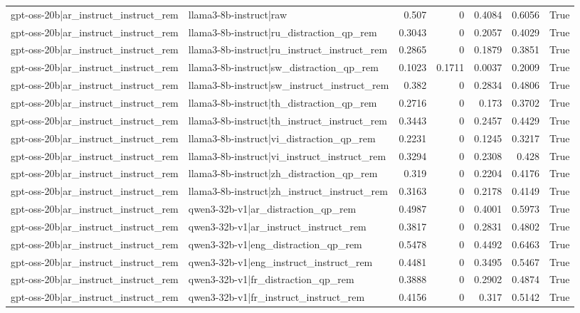 \begin{table}
\begin{tabular}{l l r r r r l}
gpt-oss-20b|ar_instruct_instruct_rem & llama3-8b-instruct|raw & 0.507 & 0 & 0.4084 & 0.6056 & True \\
gpt-oss-20b|ar_instruct_instruct_rem & llama3-8b-instruct|ru_distraction_qp_rem & 0.3043 & 0 & 0.2057 & 0.4029 & True \\
gpt-oss-20b|ar_instruct_instruct_rem & llama3-8b-instruct|ru_instruct_instruct_rem & 0.2865 & 0 & 0.1879 & 0.3851 & True \\
gpt-oss-20b|ar_instruct_instruct_rem & llama3-8b-instruct|sw_distraction_qp_rem & 0.1023 & 0.1711 & 0.0037 & 0.2009 & True \\
gpt-oss-20b|ar_instruct_instruct_rem & llama3-8b-instruct|sw_instruct_instruct_rem & 0.382 & 0 & 0.2834 & 0.4806 & True \\
gpt-oss-20b|ar_instruct_instruct_rem & llama3-8b-instruct|th_distraction_qp_rem & 0.2716 & 0 & 0.173 & 0.3702 & True \\
gpt-oss-20b|ar_instruct_instruct_rem & llama3-8b-instruct|th_instruct_instruct_rem & 0.3443 & 0 & 0.2457 & 0.4429 & True \\
gpt-oss-20b|ar_instruct_instruct_rem & llama3-8b-instruct|vi_distraction_qp_rem & 0.2231 & 0 & 0.1245 & 0.3217 & True \\
gpt-oss-20b|ar_instruct_instruct_rem & llama3-8b-instruct|vi_instruct_instruct_rem & 0.3294 & 0 & 0.2308 & 0.428 & True \\
gpt-oss-20b|ar_instruct_instruct_rem & llama3-8b-instruct|zh_distraction_qp_rem & 0.319 & 0 & 0.2204 & 0.4176 & True \\
gpt-oss-20b|ar_instruct_instruct_rem & llama3-8b-instruct|zh_instruct_instruct_rem & 0.3163 & 0 & 0.2178 & 0.4149 & True \\
gpt-oss-20b|ar_instruct_instruct_rem & qwen3-32b-v1|ar_distraction_qp_rem & 0.4987 & 0 & 0.4001 & 0.5973 & True \\
gpt-oss-20b|ar_instruct_instruct_rem & qwen3-32b-v1|ar_instruct_instruct_rem & 0.3817 & 0 & 0.2831 & 0.4802 & True \\
gpt-oss-20b|ar_instruct_instruct_rem & qwen3-32b-v1|eng_distraction_qp_rem & 0.5478 & 0 & 0.4492 & 0.6463 & True \\
gpt-oss-20b|ar_instruct_instruct_rem & qwen3-32b-v1|eng_instruct_instruct_rem & 0.4481 & 0 & 0.3495 & 0.5467 & True \\
gpt-oss-20b|ar_instruct_instruct_rem & qwen3-32b-v1|fr_distraction_qp_rem & 0.3888 & 0 & 0.2902 & 0.4874 & True \\
gpt-oss-20b|ar_instruct_instruct_rem & qwen3-32b-v1|fr_instruct_instruct_rem & 0.4156 & 0 & 0.317 & 0.5142 & True \\

\end{tabular}
\end{table}
